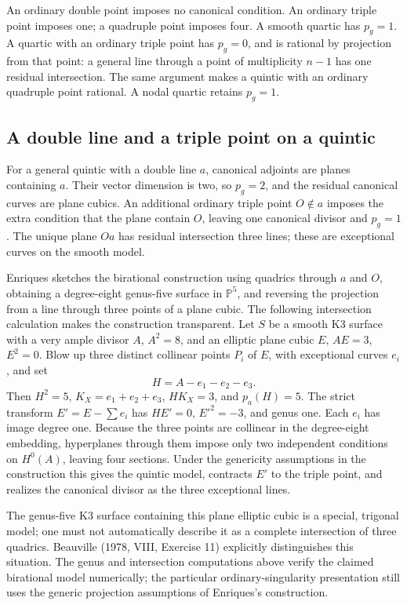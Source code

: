 An ordinary double point imposes no canonical condition. An ordinary triple point imposes one; a quadruple point imposes four. A smooth quartic has \(p_g=1\). A quartic with an ordinary triple point has \(p_g=0\), and is rational by projection from that point: a general line through a point of multiplicity \(n-1\) has one residual intersection. The same argument makes a quintic with an ordinary quadruple point rational. A nodal quartic retains \(p_g=1\).

\subsection{A double line and a triple point on a quintic}

For a general quintic with a double line \(a\), canonical adjoints are planes containing \(a\). Their vector dimension is two, so \(p_g=2\), and the residual canonical curves are plane cubics. An additional ordinary triple point \(O\notin a\) imposes the extra condition that the plane contain \(O\), leaving one canonical divisor and \(p_g=1\). The unique plane \(Oa\) has residual intersection three lines; these are exceptional curves on the smooth model.

Enriques sketches the birational construction using quadrics through \(a\) and \(O\), obtaining a degree-eight genus-five surface in \(\mathbb{P}^5\), and reversing the projection from a line through three points of a plane cubic. The following intersection calculation makes the construction transparent. Let \(S\) be a smooth K3 surface with a very ample divisor \(A\), \(A^2=8\), and an elliptic plane cubic \(E\), \(AE=3\), \(E^2=0\). Blow up three distinct collinear points \(P_i\) of \(E\), with exceptional curves \(e_i\), and set \[
H=A-e_1-e_2-e_3.
\] Then \(H^2=5\), \(K_X=e_1+e_2+e_3\), \(H K_X=3\), and \(p_a(H)=5\). The strict transform \(E'=E-\sum e_i\) has \(H E'=0\), \(E'^2=-3\), and genus one. Each \(e_i\) has image degree one. Because the three points are collinear in the degree-eight embedding, hyperplanes through them impose only two independent conditions on \(H^0(A)\), leaving four sections. Under the genericity assumptions in the construction this gives the quintic model, contracts \(E'\) to the triple point, and realizes the canonical divisor as the three exceptional lines.

The genus-five K3 surface containing this plane elliptic cubic is a special, trigonal model; one must not automatically describe it as a complete intersection of three quadrics. Beauville (1978, VIII, Exercise 11) explicitly distinguishes this situation. The genus and intersection computations above verify the claimed birational model numerically; the particular ordinary-singularity presentation still uses the generic projection assumptions of Enriques's construction.

